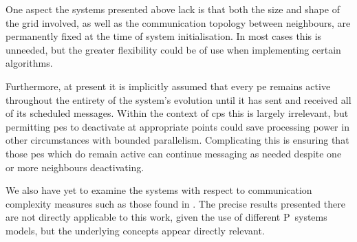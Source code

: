 One aspect the systems presented above lack is that both the size and shape of the grid involved, as well as the communication topology between neighbours, are permanently fixed at the time of system initialisation.  In most cases this is unneeded, but the greater flexibility could be of use when implementing certain algorithms.

Furthermore, at present it is implicitly assumed that every \gls{pe} remains active throughout the entirety of the system's evolution until it has sent and received all of its scheduled messages.  Within the context of \gls{cps} this is largely irrelevant, but permitting \glspl{pe} to deactivate at appropriate points could save processing power in other circumstances with bounded parallelism.  Complicating this is ensuring that those \glspl{pe} which do remain active can continue messaging as needed despite one or more neighbours deactivating.

We also have yet to examine the systems with respect to communication complexity measures such as those found in \cite{Juayong2020}.  The precise results presented there are not directly applicable to this work, given the use of different P~systems models, but the underlying concepts appear directly relevant.